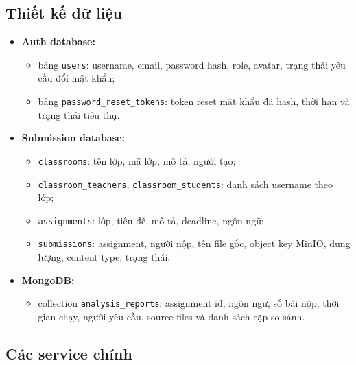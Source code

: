 \documentclass[12pt,a4paper]{article}
\begin{document}
\subsection{Thiết kế dữ liệu}

\begin{itemize}
    \item \textbf{Auth database:}
    \begin{itemize}
        \item bảng \texttt{users}: username, email, password hash, role, avatar, trạng thái yêu cầu đổi mật khẩu;
        \item bảng \texttt{password\_reset\_tokens}: token reset mật khẩu đã hash, thời hạn và trạng thái tiêu thụ.
    \end{itemize}
    \item \textbf{Submission database:}
    \begin{itemize}
        \item \texttt{classrooms}: tên lớp, mã lớp, mô tả, người tạo;
        \item \texttt{classroom\_teachers}, \texttt{classroom\_students}: danh sách username theo lớp;
        \item \texttt{assignments}: lớp, tiêu đề, mô tả, deadline, ngôn ngữ;
        \item \texttt{submissions}: assignment, người nộp, tên file gốc, object key MinIO, dung lượng, content type, trạng thái.
    \end{itemize}
    \item \textbf{MongoDB:}
    \begin{itemize}
        \item collection \texttt{analysis\_reports}: assignment id, ngôn ngữ, số bài nộp, thời gian chạy, người yêu cầu, source files và danh sách cặp so sánh.
    \end{itemize}
\end{itemize}

\subsection{Các service chính}
\end{document}
